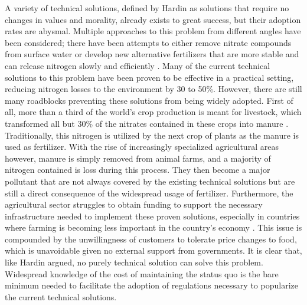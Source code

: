 \documentclass[12pt]{article}
\begin{document}
	A variety of technical solutions, defined by Hardin as solutions  that require no changes in values and morality,  already exists to great success, but their adoption rates are abysmal. Multiple approaches to this problem from different angles have been considered; there have been attempts to either remove nitrate compounds from surface water or develop new alternative fertilizers that are more stable and can release nitrogen slowly and efficiently \cite{fallahpour09}. Many of the current technical solutions to this problem have been proven to be effective in a practical setting, reducing nitrogen losses to the environment by 30 to 50\%. However, there are still many roadblocks preventing these solutions from being widely adopted. First of all, more than a third of the world’s crop production is meant for livestock, which transformed all but 30\% of the nitrates contained in these crops into manure \cite{issuesinecology}. Traditionally, this nitrogen is utilized by the next crop of plants as the manure is used as fertilizer. With the rise of increasingly specialized agricultural areas however, manure is simply removed from animal farms, and a majority of nitrogen contained is loss during this process. They then become a major pollutant that are not always covered by the existing technical solutions but are still a direct consequence of the widespread usage of fertilizer. Furthermore, the agricultural sector struggles to obtain funding to support the necessary infrastructure needed to implement these proven solutions, especially in countries where farming is becoming less important in the country's economy . This issue is compounded by the unwillingness of customers to tolerate price changes to food, which is unavoidable given no external support from governments. It is clear that, like Hardin argued, no purely technical solution can solve this problem. Widespread knowledge of the cost of maintaining the status quo is the bare minimum needed to facilitate the adoption of regulations necessary to popularize the current technical solutions. 
	
\end{document}
